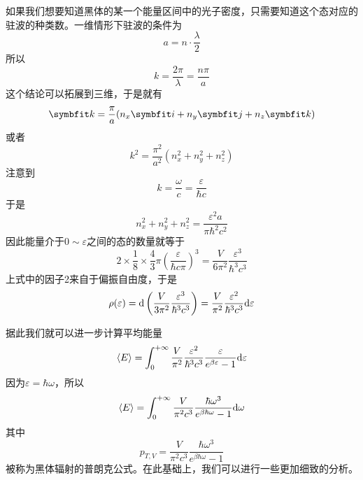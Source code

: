 \begin{remark}
    如果我们想要知道黑体的某一个能量区间中的光子密度，只需要知道这个态对应的驻波的种类数。一维情形下驻波的条件为\begin{equation}
        a=n\cdot \frac{\lambda}{2}
    \end{equation}
    所以\begin{equation}
        k=\frac{2\pi}{\lambda} =\frac{n\pi}{a}
    \end{equation}
    这个结论可以拓展到三维，于是就有\begin{equation}
        \bd{k}=\frac{\pi}{a} (n_x \bd{i}+n_y\bd{j}+n_z\bd{k})
    \end{equation}
    或者\begin{equation}
        k^2 =\frac{\pi^2}{a^2} (n_x^2+n_y^2+n_z^2)
    \end{equation}
    注意到\begin{equation}
        k=\frac{\omega}{c} =\frac{\varepsilon}{\hbar c}
    \end{equation}
    于是\begin{equation}
        n_x^2+n_y^2+n_z^2 =\frac{\varepsilon^2 a}{\pi\hbar^2 c^2} 
    \end{equation}
    因此能量介于$0\sim \varepsilon$之间的态的数量就等于\begin{equation}
        2\times\frac{1}{8} \times \frac{4}{3} \pi \left(\frac{\varepsilon}{\hbar c\pi}\right)^3=\frac{V}{6\pi^2} \frac{\varepsilon^3}{\hbar^3 c^3}
    \end{equation}
    上式中的因子2来自于偏振自由度，于是\begin{equation}
        \rho(\varepsilon) =\mathrm{d}\left(\frac{V}{3\pi^2} \frac{\varepsilon^3}{\hbar^3 c^3} \right) =\frac{V}{\pi^2}\frac{\varepsilon^2}{\hbar^3c^3} \mathrm{d}\varepsilon
    \end{equation}
\end{remark}

据此我们就可以进一步计算平均能量\begin{equation}
    \braket{E} =\int_{0}^{+\infty}\frac{V}{\pi^2}\frac{\varepsilon^2}{\hbar^3c^3} \frac{\varepsilon}{e^{\beta\varepsilon}-1}\mathrm{d}\varepsilon
\end{equation}
因为$\varepsilon=\hbar \omega$，所以\begin{equation}
    \braket{E} =\int_{0}^{+\infty}\frac{V}{\pi^2 c^3 }\frac{\hbar\omega^3}{e^{\beta\hbar\omega}-1} \mathrm{d}\omega
\end{equation}
其中\begin{equation}
    p_{T,V} =\frac{V}{\pi^2c^3} \frac{\hbar\omega^3}{e^{\beta \hbar\omega}-1}
\end{equation}
被称为黑体辐射的普朗克公式。在此基础上，我们可以进行一些更加细致的分析。

